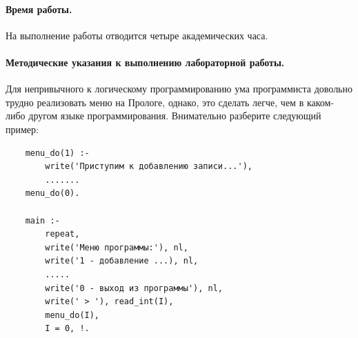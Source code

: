 \documentclass[12pt, openany, twoside]{book} %
\begin{document}
\paragraph{Время работы.} На выполнение работы отводится четыре академических часа.

\paragraph{Методические указания к выполнению лабораторной работы.} Для непривычного к логическому программированию ума программиста довольно трудно реализовать меню на Прологе, однако, это сделать легче, чем в каком-либо другом языке программирования. Внимательно разберите следующий пример:

{\tt\begin{verbatim}
    menu_do(1) :-
        write('Приступим к добавлению записи...'),
        .......
    menu_do(0).

    main :-
        repeat,
        write('Меню программы:'), nl,
        write('1 - добавление ...), nl,
        .....
        write('0 - выход из программы'), nl,
        write(' > '), read_int(I),
        menu_do(I),
        I = 0, !.
\end{verbatim}}
\end{document}
